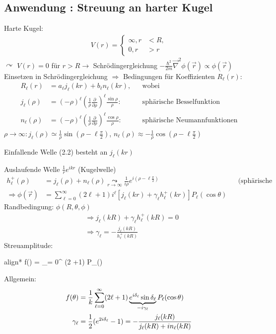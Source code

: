 \subsection{Anwendung : Streuung an harter Kugel} 
	Harte Kugel:
	\begin{align*}
	V (r) =
	\left\{
	\begin{aligned}
	\infty , r &< R, \\
	0 , r &> r
	\end{aligned}
	\right.
	\end{align*}
	$\curvearrowright$ 
	$V(r)= 0$ für $r>R \rightarrow$ Schrödingergleichung $-\frac{\hbar^2}{2m} \vec{\nabla}^2 \phi(\vec{r})
	\propto \phi(\vec{r})$
	Einsetzen in Schrödingergleichung $\Rightarrow$ Bedingungen für Koeffizienten $R_\ell(r)$:
		\begin{align*}
			R_\ell(r) &= a_\ell j_\ell (kr) + b_\ell n_\ell (kr) ,& &\text{wobei}\\
			j_\ell(\rho) &= (-\rho)^\ell \left(\frac{1}{\rho} \frac{\partial}{\partial \rho}\right)^\ell
			\frac{\sin \rho}{\rho} :& &\text{sphärische Besselfunktion}\\
			n_\ell(\rho) &= (-\rho)^\ell \left(\frac{1}{\rho} \frac{\partial}{\partial \rho}\right)^\ell
			\frac{\cos \rho}{\rho} :& &\text{sphärische Neumannfunktionen}
		\end{align*}
	$\rho \rightarrow \infty : j_\ell (\rho) \simeq \frac{1}{\rho} \sin(\rho-\ell\frac{\pi}{2})$,
	$n_\ell (\rho) \approx -\frac{1}{\rho}  \cos(\rho-\ell\frac{\pi}{2})$
	
	Einfallende Welle (2.2) besteht an $j_\ell (kr)$
	
	Auslaufende Welle $ %
	\frac{1}{r} e^{ikr}$ (Kugelwelle)
		\begin{align*}
			h_\ell^+ (\rho) &= j_\ell (\rho) + n_\ell(\rho) \underset{r \rightarrow \infty}{\leadsto} 
			\frac{1}{i\rho} e^{i(\rho-\ell\frac{\pi}{2})} &
			&\text{(sphärische Hantelfunktion 1ter Art)} \\
			\Rightarrow \phi (\vec{r}) &= \sum_{\ell=0}^{\infty} (2 \ell +1) i^\ell
			\left[ j_\ell (kr) +\gamma_\ell h^+_\ell (kr)
			\right] P_\ell (\cos \theta)
		\end{align*}
	Randbedingung: $\phi (R, \theta, \phi)$
		\begin{align*}
			&\Rightarrow j_\ell (kR) + \gamma_\ell h_\ell^+(kR) = 0\\
			&\Rightarrow \gamma_\ell = -\frac{j_\ell(kR)}{h_\ell^+ (kR)}
		\end{align*}
	Streuamplitude:
		\begin{empheq}[box=\boxed]{align*}
			f(\theta) = \sum_{\ell = 0}^{\infty} (2 \ell +1)  P_\ell(\cos \theta)
		\end{empheq}
	Allgemein:
		\begin{align*}
			f(\theta) &= \frac{1}{k} \sum_{\ell = 0}^{\infty}
			(2 \ell + 1) \underbrace{e^{i\delta_\ell} \sin \delta_\ell}_{\mathclap{-i \gamma_\ell}}
			P_\ell (\cos \theta) \\
			\gamma_\ell &= \frac{1}{2} (e^{2i\delta_\ell} - 1)
			= -\frac{j_\ell(kR)}{j_\ell(kR)+ in_\ell (kR)}
		\end{align*}
		
